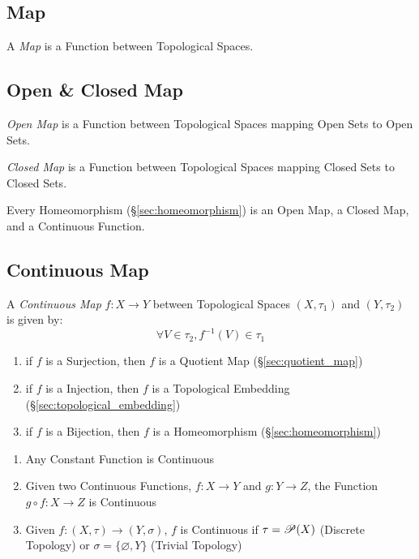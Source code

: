 \subsection{Map}\label{sec:topology_map}

A \emph{Map} is a Function between Topological Spaces.



\subsection{Open \& Closed Map}\label{sec:open_closed_map}

\emph{Open Map} is a Function between Topological Spaces mapping Open
Sets to Open Sets.

\emph{Closed Map} is a Function between Topological Spaces mapping Closed
Sets to Closed Sets.

Every Homeomorphism (\S\ref{sec:homeomorphism}) is an Open Map, a
Closed Map, and a Continuous Function.



\subsection{Continuous Map}\label{sec:continuous_map}

A \emph{Continuous Map} $f : X \rightarrow Y$ between Topological
Spaces $(X,\tau_1)$ and $(Y,\tau_2)$ is given by:
\[
  \forall V \in \tau_2, f^{-1}(V) \in \tau_1
\]

\begin{enumerate}
  \item if $f$ is a Surjection, then $f$ is a Quotient Map
    (\S\ref{sec:quotient_map})
  \item if $f$ is a Injection, then $f$ is a Topological Embedding
    (\S\ref{sec:topological_embedding})
  \item if $f$ is a Bijection, then $f$ is a Homeomorphism
    (\S\ref{sec:homeomorphism})
\end{enumerate}

\begin{enumerate}
  \item Any Constant Function is Continuous
  \item Given two Continuous Functions, $f : X \rightarrow Y$ and $g
    : Y \rightarrow Z$, the Function $g \circ f : X \rightarrow Z$ is
    Continuous
  \item Given $f : (X, \tau) \rightarrow (Y, \sigma)$, $f$ is
    Continuous if $\tau = \mathscr{P}(X)$ (Discrete Topology) or
    $\sigma = \{\varnothing, Y\}$ (Trivial Topology)
\end{enumerate}

